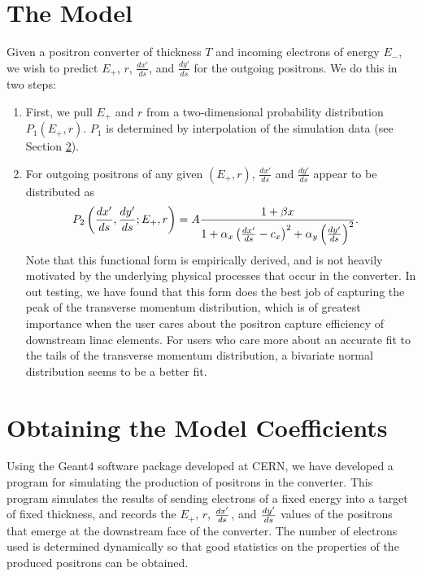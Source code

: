 \documentclass[12pt]{article}
\begin{document}
\newpage

\section{The Model}
\label{s:model}

Given a positron converter of thickness $T$ and incoming electrons of energy $E_-$, we wish to predict $E_+$, $r$, $\frac{dx'}{ds}$, and $\frac{dy'}{ds}$ for the outgoing positrons.
We do this in two steps:
\begin{enumerate}
\item
First, we pull $E_+$ and $r$ from a two-dimensional probability distribution $P_1(E_+, r)$.
$P_1$ is determined by interpolation of the simulation data (see Section \ref{s:simulation}).

\item
For outgoing positrons of any given $(E_+, r)$, $\frac{dx'}{ds}$ and $\frac{dy'}{ds}$ appear to be distributed as
\begin{align*}
P_2 \left( \frac{dx'}{ds}, \frac{dy'}{ds} ; E_+, r \right) & = A \frac{1 + \beta x}{1 + \alpha_x \left( \frac{dx'}{ds} - c_x \right)^2 + \alpha_y \left( \frac{dy'}{ds} \right)^2}.
\end{align*}
Note that this functional form is empirically derived, and is not heavily motivated by the underlying physical processes that occur in the converter.
In out testing, we have found that this form does the best job of capturing the peak of the transverse momentum distribution, which is of greatest importance when the user cares about the positron capture efficiency of downstream linac elements.
For users who care more about an accurate fit to the tails of the transverse momentum distribution, a bivariate normal distribution seems to be a better fit.

\end{enumerate}



\section{Obtaining the Model Coefficients}
\label{s:simulation}

Using the Geant4\cite{geant} software package developed at CERN, we have developed a program for simulating the production of positrons in the converter.
This program simulates the results of sending electrons of a fixed energy into a target of fixed thickness, and records the $E_+$, $r$, $\frac{dx'}{ds}$, and $\frac{dy'}{ds}$ values of the positrons that emerge at the downstream face of the converter.
The number of electrons used is determined dynamically so that good statistics on the properties of the produced positrons can be obtained.
\end{document}
